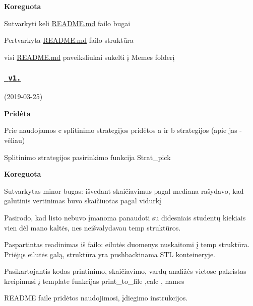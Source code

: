 {\bfseries{Koreguota}}
\begin{DoxyItemize}
\item Sutvarkyti keli \mbox{\hyperlink{_r_e_a_d_m_e_8md}{R\+E\+A\+D\+M\+E.\+md}} failo bug\textquotesingle{}ai
\item Pertvarkyta \mbox{\hyperlink{_r_e_a_d_m_e_8md}{R\+E\+A\+D\+M\+E.\+md}} failo struktūra
\item visi \mbox{\hyperlink{_r_e_a_d_m_e_8md}{R\+E\+A\+D\+M\+E.\+md}} paveiksliukai sukelti į {\ttfamily Memes} folderį
\end{DoxyItemize}



 \subsubsection*{\href{https://github.com/gitguuddd/Obj_Duomenu_apdorojimas/releases/tag/v1.0}{\texttt{ v1.}}}

(2019-\/03-\/25)

{\bfseries{Pridėta}}
\begin{DoxyItemize}
\item Prie naudojamos {\ttfamily c} splitinimo strategijos pridėtos {\ttfamily a} ir {\ttfamily b} strategijos (apie jas -\/ vėliau)
\item Splitinimo strategijos pasirinkimo funkcija {\ttfamily Strat\+\_\+pick}
\end{DoxyItemize}

{\bfseries{Koreguota}}
\begin{DoxyItemize}
\item Sutvarkytas minor bug\textquotesingle{}as\+: išvedant skaičiavimus pagal mediana rašydavo, kad galutinis vertinimas buvo skaičiuotas pagal vidurkį
\item Pasirodo, kad listo nebuvo įmanoma panaudoti su didesniais studentų kiekiais vien dėl mano kaltės, nes neišvalydavau temp struktūros.
\item Paspartintas readinimas iš failo\+: eilutės duomenys nuskaitomi į temp struktūra. Priėjųs eilutės galą, struktūra yra pushbackinama S\+TL konteineryje.
\item Pasikartojantis kodas printinimo, skaičiavimo, vardų analižės vietose pakeistas kreipimusi į template funkcijas {\ttfamily print\+\_\+to\+\_\+file ,calc , names}
\item R\+E\+A\+D\+ME fail\textquotesingle{}e pridėtos naudojimosi, įdiegimo instrukcijos.
\end{DoxyItemize}




